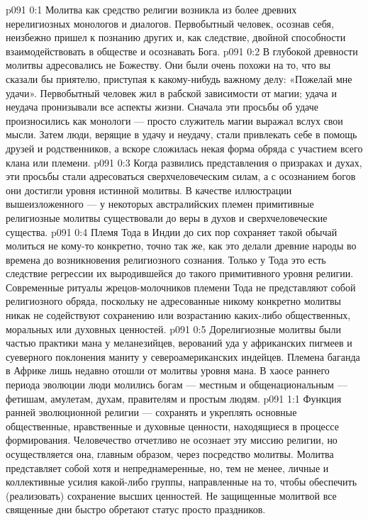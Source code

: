 \author{Глава срединников}
\vs p091 0:1 Молитва как средство религии возникла из более древних нерелигиозных монологов и диалогов. Первобытный человек, осознав себя, неизбежно пришел к познанию других и, как следствие, двойной способности взаимодействовать в обществе и осознавать Бога.
\vs p091 0:2 В глубокой древности молитвы адресовались не Божеству. Они были очень похожи на то, что вы сказали бы приятелю, приступая к какому\hyp{}нибудь важному делу: «Пожелай мне удачи». Первобытный человек жил в рабской зависимости от магии; удача и неудача пронизывали все аспекты жизни. Сначала эти просьбы об удаче произносились как монологи --- просто служитель магии выражал вслух свои мысли. Затем люди, верящие в удачу и неудачу, стали привлекать себе в помощь друзей и родственников, а вскоре сложилась некая форма обряда с участием всего клана или племени.
\vs p091 0:3 Когда развились представления о призраках и духах, эти просьбы стали адресоваться сверхчеловеческим силам, а с осознанием богов они достигли уровня истинной молитвы. В качестве иллюстрации вышеизложенного --- у некоторых австралийских племен примитивные религиозные молитвы существовали до веры в духов и сверхчеловеческие существа.
\vs p091 0:4 Племя Тода в Индии до сих пор сохраняет такой обычай молиться не кому\hyp{}то конкретно, точно так же, как это делали древние народы во времена до возникновения религиозного сознания. Только у Тода это есть следствие регрессии их выродившейся до такого примитивного уровня религии. Современные ритуалы жрецов\hyp{}молочников племени Тода не представляют собой религиозного обряда, поскольку не адресованные никому конкретно молитвы никак не содействуют сохранению или возрастанию каких\hyp{}либо общественных, моральных или духовных ценностей.
\vs p091 0:5 Дорелигиозные молитвы были частью практики мана у меланезийцев, верований уда у африканских пигмеев и суеверного поклонения маниту у североамериканских индейцев. Племена баганда в Африке лишь недавно отошли от молитвы уровня мана. В хаосе раннего периода эволюции люди молились богам --- местным и общенациональным --- фетишам, амулетам, духам, правителям и простым людям.
\vs p091 1:1 Функция ранней эволюционной религии --- сохранять и укреплять основные общественные, нравственные и духовные ценности, находящиеся в процессе формирования. Человечество отчетливо не осознает эту миссию религии, но осуществляется она, главным образом, через посредство молитвы. Молитва представляет собой хотя и непреднамеренные, но, тем не менее, личные и коллективные усилия какой\hyp{}либо группы, направленные на то, чтобы обеспечить (реализовать) сохранение высших ценностей. Не защищенные молитвой все священные дни быстро обретают статус просто праздников.
